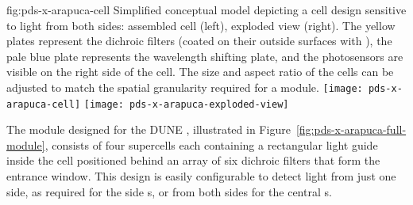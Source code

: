  \begin{dunefigure}{fig:pds-x-arapuca-cell}
{Simplified conceptual model depicting a  cell design sensitive to light from both sides: assembled cell (left),  exploded view (right). The yellow plates represent the dichroic filters (coated on their outside surfaces with  ), the pale blue plate represents the wavelength shifting plate, and the photosensors are visible on the right side of the cell. The size and aspect ratio of the cells can be adjusted to match the spatial granularity required for a  module. 
} 
  \texttt{[image: pds-x-arapuca-cell]}
  \texttt{[image: pds-x-arapuca-exploded-view]}
\end{dunefigure}

The   module designed for the DUNE , illustrated in Figure~\ref{fig:pds-x-arapuca-full-module}, consists of four supercells each containing a rectangular 
light guide inside the cell positioned behind an array of six dichroic filters that form the entrance window.  
This design is easily configurable to detect light from just one side, as required for the side s, or from both sides for the central s. 

